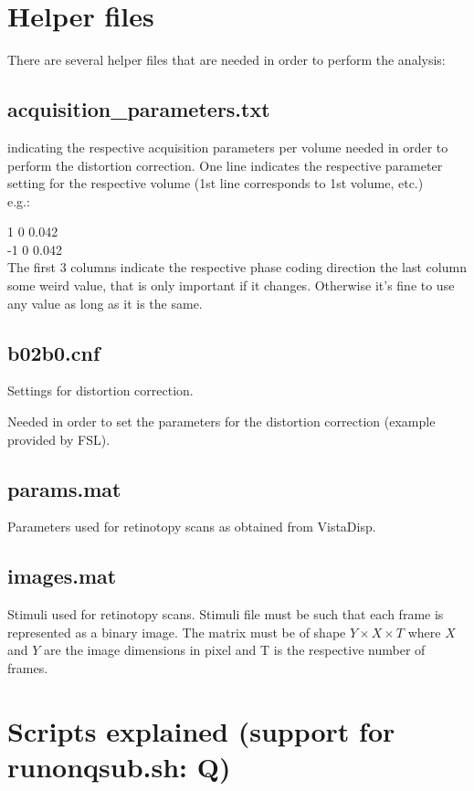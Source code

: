 \documentclass[12pt,a4paper]{scrartcl}
\begin{document}
\section{Helper files}
There are several helper files that are needed in order to perform the analysis:

\subsection{acquisition\_parameters.txt}
indicating the respective acquisition parameters per volume needed in order to perform the distortion correction. One line indicates the respective parameter setting for the respective volume (1st line corresponds to 1st volume, etc.)\\

\noindent e.g.:

 1 0 0.042\\
 -1 0 0.042\\

The first 3 columns indicate the respective phase coding direction the last column some weird value, that is only important if it changes. Otherwise it's fine to use any value as long as it is the same.

\subsection{b02b0.cnf}
Settings for distortion correction.

Needed in order to set the parameters for the distortion correction (example provided by FSL).

\subsection{params.mat}
Parameters used for retinotopy scans as obtained from VistaDisp.

\subsection{images.mat}
Stimuli used for retinotopy scans. Stimuli file must be such that each frame is represented as a binary image. The matrix must be of shape $Y \times X \times T$ where $X$ and $Y$ are the image dimensions in pixel and T is the respective number of frames.

\section{Scripts explained (support for runonqsub.sh: Q)}
\end{document}
